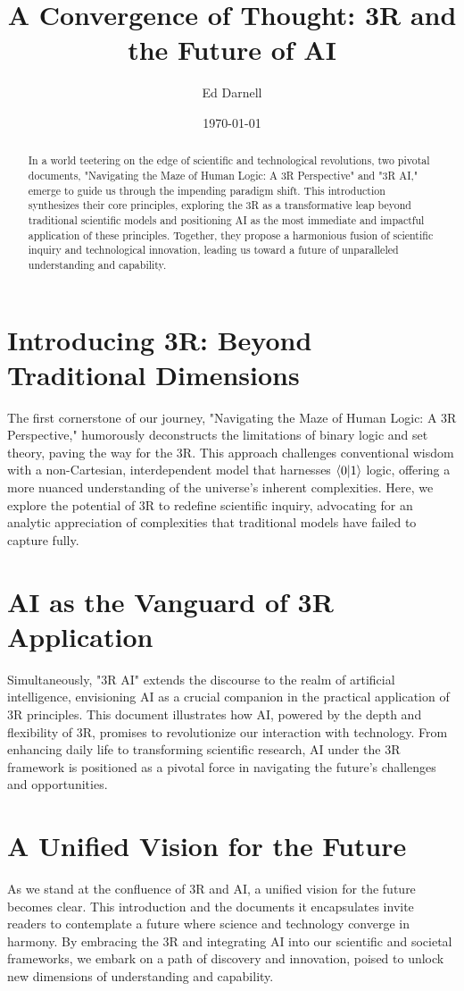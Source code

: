 \documentclass[12pt]{article}
\title{A Convergence of Thought: 3R and the Future of AI}
\author{Ed Darnell}
\date{\today}
\begin{document}
\maketitle

\begin{abstract}
In a world teetering on the edge of scientific and technological revolutions, two pivotal documents, "Navigating the Maze of Human Logic: A 3R Perspective" and "3R AI," emerge to guide us through the impending paradigm shift. This introduction synthesizes their core principles, exploring the 3R as a transformative leap beyond traditional scientific models and positioning AI as the most immediate and impactful application of these principles. Together, they propose a harmonious fusion of scientific inquiry and technological innovation, leading us toward a future of unparalleled understanding and capability.
\end{abstract}

\section*{Introducing 3R: Beyond Traditional Dimensions}
The first cornerstone of our journey, "Navigating the Maze of Human Logic: A 3R Perspective," humorously deconstructs the limitations of binary logic and set theory, paving the way for the 3R. This approach challenges conventional wisdom with a non-Cartesian, interdependent model that harnesses \(\langle 0 | 1 \rangle\) logic, offering a more nuanced understanding of the universe's inherent complexities. Here, we explore the potential of 3R to redefine scientific inquiry, advocating for an analytic appreciation of complexities that traditional models have failed to capture fully.

\section*{AI as the Vanguard of 3R Application}
Simultaneously, "3R AI" extends the discourse to the realm of artificial intelligence, envisioning AI as a crucial companion in the practical application of 3R principles. This document illustrates how AI, powered by the depth and flexibility of 3R, promises to revolutionize our interaction with technology. From enhancing daily life to transforming scientific research, AI under the 3R framework is positioned as a pivotal force in navigating the future's challenges and opportunities.

\section*{A Unified Vision for the Future}
As we stand at the confluence of 3R and AI, a unified vision for the future becomes clear. This introduction and the documents it encapsulates invite readers to contemplate a future where science and technology converge in harmony. By embracing the 3R and integrating AI into our scientific and societal frameworks, we embark on a path of discovery and innovation, poised to unlock new dimensions of understanding and capability.
\end{document}
